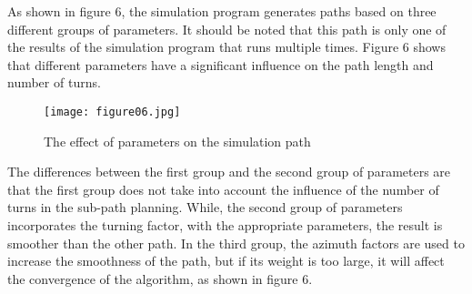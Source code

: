 \documentclass{iosart2c}
\begin{document}
As shown in figure 6, the simulation program generates paths based on three different groups of parameters. It should be noted that this path is only one of the results of the simulation program that runs multiple times. Figure 6 shows that different parameters have a significant influence on the path length and number of turns. 

\begin{figure}[htbp] %
\vspace{-0.2cm} 
\setlength{\abovecaptionskip}{0.1cm}  %
\texttt{[image: figure06.jpg]}
\caption{ The effect of parameters on the simulation path}\label{f6}
\end{figure}

The differences between the first group and the second group of parameters are that the first group does not take into account the influence of the number of turns in the sub-path planning. While, the second group of parameters incorporates the turning factor, with the appropriate parameters, the result is smoother than the other path. In the third group, the azimuth factors are used to increase the smoothness of the path, but if its weight is too large, it will affect the convergence of the algorithm, as shown in figure 6.
\end{document}
